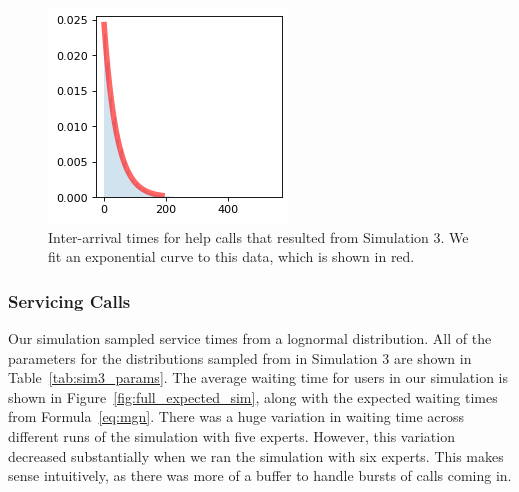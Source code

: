 \begin{figure}[H]
  \includegraphics{figures/montecarlo/call_times.png}
  \vspace{-0.25cm}
  \caption[Inter-arrival times for help calls that resulted from Simulation 3]{
    Inter-arrival times for help calls that resulted from Simulation 3.
    We fit an exponential curve to this data, which is shown in red.
  }\label{fig:step_patience}
\end{figure}

\pagebreak

\subsubsection{Servicing Calls}

Our simulation sampled service times from a lognormal distribution.
All of the parameters for the distributions sampled from in Simulation 3 are
shown in Table~\ref{tab:sim3_params}.
The average waiting time for users in our simulation is shown in
Figure~\ref{fig:full_expected_sim}, along with the expected waiting times from
Formula~\ref{eq:mgn}.
There was a huge variation in waiting time across different runs of the
simulation with five experts.
However, this variation decreased substantially when we ran the simulation with
six experts.
This makes sense intuitively, as there was more of a buffer to handle bursts of
calls coming in.

